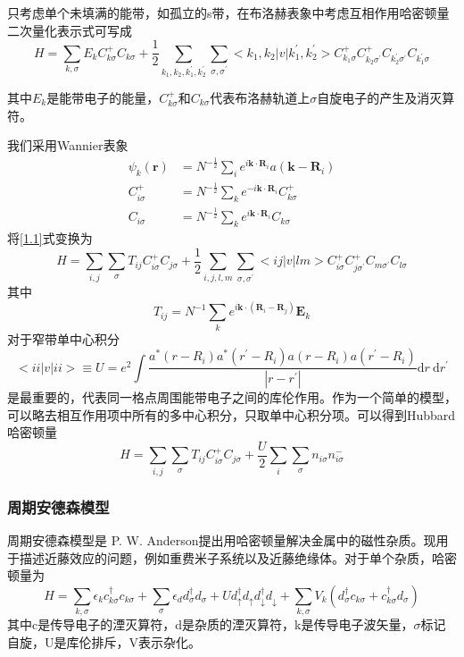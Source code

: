 只考虑单个未填满的能带，如孤立的s带，在布洛赫表象中考虑互相作用哈密顿量二次量化表示式可写成
\begin{equation}
    H=\sum_{k, \sigma} E_{k} C_{k \sigma}^{+} C_{k \sigma}+\frac{1}{2} \sum_{k_{1}, k_{2}, k_{1}^{\prime}, k_{2}^{\prime}} \sum_{\sigma, \sigma^{\prime}}<k_{1}, k_{2}|v| k_{1}^{\prime}, k_{2}^{\prime}>C_{k_{1} \sigma}^{+} C_{k_{2} \sigma^{\prime}}^{+} C_{k^{\prime}_2 \sigma^{\prime}} C_{k^{\prime}_1 \sigma}
    \label{1.1}
\end{equation}

其中$E_k$是能带电子的能量，$C^+_{k \sigma}$和$C_{k \sigma}$代表布洛赫轨道上$\sigma$自旋电子的产生及消灭算符。

我们采用Wannier表象
\begin{align*}
    \psi_k(\textbf{r})&=N^{-\frac{1}{2}}\sum_i e^{i\textbf{k}\cdot \textbf{R}_i} a(\textbf{k} - \textbf{R}_i)\\
    C^+_{i \sigma}&=N^{-\frac{1}{2}} \sum_k e^{- i\textbf{k}\cdot \textbf{R}_i} C^+_{k \sigma}\\
    C_{i \sigma}&=N^{-\frac{1}{2}} \sum_k e^{i\textbf{k}\cdot \textbf{R}_i} C_{k \sigma}
\end{align*}
将\ref{1.1}式变换为
$$
H=\sum_{i, j} \sum_{\sigma} T_{i j} C_{i \sigma}^{+} C_{j \sigma}+\frac{1}{2} \sum_{i, j, l, m} \sum_{\sigma, \sigma^{\prime}}<i j|v| l m>C_{i \sigma}^{+} C_{j \sigma^{\prime}}^{+} C_{m \sigma^{\prime}} C_{l \sigma}
$$
其中
$$T_{ij}=N^{-1}\sum_k e^{i \textbf{k} \cdot (\textbf{R}_i-\textbf{R}_j)}\textbf{E}_k$$
对于窄带单中心积分
$$
<i i|v| i i>\equiv U=e^{2} \int \frac{a^{*}\left(r-R_{i}\right) a^{*}\left(r^{\prime}-R_{i}\right) a\left(r-R_{i}\right) a\left(r^{\prime}-R_{i}\right)}{\left|r-r^{\prime}\right|} \mathrm{d} r \mathrm{~d} r^{\prime}
$$
是最重要的，代表同一格点周围能带电子之间的库伦作用。作为一个简单的模型，可以略去相互作用项中所有的多中心积分，只取单中心积分项。可以得到Hubbard哈密顿量
$$
H=\sum_{i, j} \sum_{\sigma} T_{i j} C_{i \sigma}^{+} C_{j \sigma}+\frac{U}{2} \sum_{i} \sum_{\sigma} n_{i \sigma} n_{i \sigma}^{-}
$$

\subsubsection{周期安德森模型}
周期安德森模型是 P. W. Anderson提出用哈密顿量解决金属中的磁性杂质\cite{2}。现用于描述近藤效应的问题，例如重费米子系统以及近藤绝缘体。对于单个杂质，哈密顿量为
$$
H=\sum_{k, \sigma} \epsilon_{k} c_{k \sigma}^{\dagger} c_{k \sigma}+\sum_{\sigma} \epsilon_{d} d_{\sigma}^{\dagger} d_{\sigma}+U d_{\uparrow}^{\dagger} d_{\uparrow} d_{\downarrow}^{\dagger} d_{\downarrow}+\sum_{k, \sigma} V_{k}\left(d_{\sigma}^{\dagger} c_{k \sigma}+c_{k \sigma}^{\dagger} d_{\sigma}\right)
$$
其中c是传导电子的湮灭算符，d是杂质的湮灭算符，k是传导电子波矢量，$\sigma$标记自旋，U是库伦排斥，V表示杂化。

